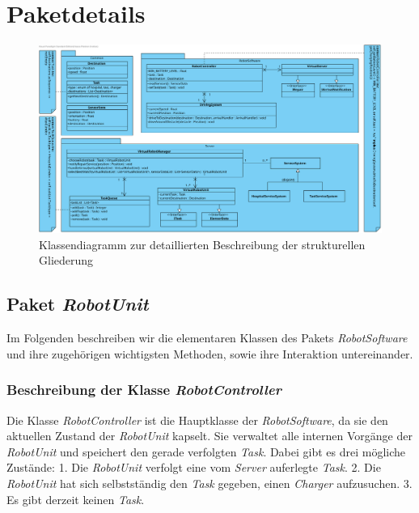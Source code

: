\section{Paketdetails}
\begin{figure}[H]
\centering
\includegraphics[height=0.75\linewidth, angle=90]{img/7-paketdetails}
\caption{Klassendiagramm zur detaillierten Beschreibung der strukturellen Gliederung}
\label{Paketdetails}
\end{figure}

\subsection{Paket \textit{RobotUnit}}
	Im Folgenden beschreiben wir die elementaren Klassen des Pakets \textit{RobotSoftware} 
	und ihre zugehörigen wichtigsten Methoden, sowie ihre Interaktion untereinander. 


	\subsubsection{Beschreibung der Klasse \textit{RobotController}}
		
		Die Klasse \textit{RobotController} ist die Hauptklasse der \textit{RobotSoftware}, 
		da sie den aktuellen Zustand der \textit{RobotUnit} kapselt.
		Sie verwaltet alle internen Vorgänge der \emph{RobotUnit} und speichert den gerade verfolgten \textit{Task}. Dabei gibt es drei mögliche Zustände: 1. Die \emph{RobotUnit} verfolgt eine vom \emph{Server} auferlegte \emph{Task}. 2. Die \emph{RobotUnit} hat sich selbstständig den \emph{Task} gegeben, einen \emph{Charger} aufzusuchen. 3. Es gibt derzeit keinen \emph{Task}.

